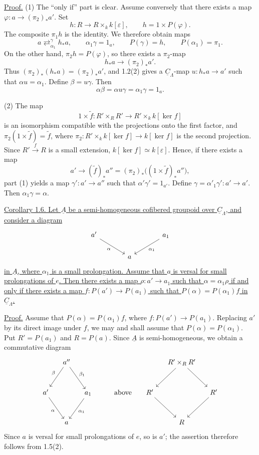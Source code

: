 \underline{Proof.} (1) The ``only if'' part is clear. Assume conversely
that there exists a map
$\varphi:a\longrightarrow(\pi_2)_*a'$. Set
\[
 h:R\longrightarrow R\times_k k[\varepsilon],
 \qquad h=1\times P(\varphi).
\]
The composite $\pi_1h$ is the identity. We therefore obtain maps
\[
 a\mathrel{\mathop{\rightleftarrows}^{\gamma}_{\alpha_1}}h_*a,
 \qquad \alpha_1\gamma=1_a,
 \qquad P(\gamma)=h,
 \qquad P(\alpha_1)=\pi_1.
\]
On the other hand, $\pi_2h=P(\varphi)$, so there exists a
$\pi_2$-map
\[
 h_*a\longrightarrow(\pi_2)_*a'.
\]
Thus $(\pi_2)_*(h_*a)=(\pi_2)_*a'$, and 1.2(2) gives a
$\underline C_\Lambda$-map $u:h_*a\longrightarrow a'$ such that
$\alpha u=\alpha_1$. Define $\beta=u\gamma$. Then
\[
 \alpha\beta=\alpha u\gamma=\alpha_1\gamma=1_a.
\]

(2) The map
\[
 1\times\widetilde f:R'\times_RR'
 \longrightarrow R'\times_k k[\ker f]
\]
is an isomorphism compatible with the projections onto the first
factor, and $\pi_2(1\times\widetilde f)=\widetilde f$, where
$\pi_2:R'\times_k k[\ker f]\longrightarrow k[\ker f]$ is the second
projection. Since $R'\xrightarrow fR$ is a small extension,
$k[\ker f]\simeq k[\varepsilon]$. Hence, if there exists a map
\[
 a'\longrightarrow(\widetilde f)_*a''
   =(\pi_2)_*\bigl((1\times\widetilde f)_*a''\bigr),
\]
part (1) yields a map $\gamma':a'\longrightarrow a''$ such that
$\alpha'\gamma'=1_{a'}$. Define
$\gamma=\alpha'_1\gamma':a'\longrightarrow a'$. Then
$\alpha_1\gamma=\alpha$.


\underline{Corollary 1.6. Let $\underline A$ be a semi-homogeneous
cofibered groupoid over $\underline C_\Lambda$, and consider a diagram}
\[
\begin{tikzcd}[column sep=large]
a' \arrow[dr,"\alpha"'] & & a_1 \arrow[dl,"\alpha_1"] \\
& a &
\end{tikzcd}
\]
\underline{in $\underline A$, where $\alpha_1$ is a small
prolongation. Assume that $a$ is versal for small prolongations of
$e$. Then there exists a map $\rho:a'\longrightarrow a_1$ such that
$\alpha=\alpha_1\rho$ if and only if there exists a map
$f:P(a')\longrightarrow P(a_1)$ such that
$P(\alpha)=P(\alpha_1)f$ in $\underline C_\Lambda$.}

\underline{Proof.} Assume that $P(\alpha)=P(\alpha_1)f$, where
$f:P(a')\longrightarrow P(a_1)$. Replacing $a'$ by its direct image
under $f$, we may and shall assume that
$P(\alpha)=P(\alpha_1)$. Put $R'=P(a_1)$ and $R=P(a)$. Since
$\underline A$ is semi-homogeneous, we obtain a commutative diagram
\[
\begin{tikzcd}[row sep=large,column sep=small]
& a'' \arrow[dl,"\beta"'] \arrow[dr,"\beta_1"]
  & & & & & R'\times_RR' \arrow[dl] \arrow[dr] & \\
a' \arrow[dr,"\alpha"'] & & a_1 \arrow[dl,"\alpha_1"]
  & & \text{above} & R' \arrow[dr] & & R' \arrow[dl] \\
& a & & & & & R &
\end{tikzcd}
\]
Since $a$ is versal for small prolongations of $e$, so is $a'$;
the assertion therefore follows from 1.5(2).

